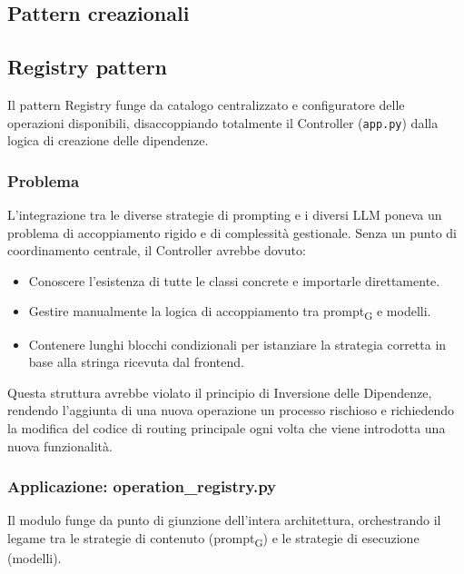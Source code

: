 \documentclass[11pt,a4paper]{article}
\newcommand{\gls}[1]{#1\textsubscript{G}}
\begin{document}
\newpage

\subsection{Pattern creazionali}
\subsection{Registry pattern}
Il pattern Registry funge da catalogo centralizzato e configuratore delle operazioni disponibili, disaccoppiando totalmente il Controller (\texttt{app.py}) dalla logica di creazione delle dipendenze.

\subsubsection{Problema}
L’integrazione tra le diverse strategie di prompting e i diversi LLM poneva un problema di accoppiamento rigido e di complessità gestionale. Senza un punto di coordinamento centrale, il Controller avrebbe dovuto:
\begin{itemize}
    \item Conoscere l'esistenza di tutte le classi concrete e importarle direttamente.
    \item Gestire manualmente la logica di accoppiamento tra \gls{prompt} e modelli.
    \item Contenere lunghi blocchi condizionali per istanziare la strategia corretta in base alla stringa ricevuta dal frontend.
\end{itemize}
Questa struttura avrebbe violato il principio di Inversione delle Dipendenze, rendendo l'aggiunta di una nuova operazione un processo rischioso e richiedendo la modifica del codice di routing principale ogni volta che viene introdotta una nuova funzionalità.

\subsubsection{Applicazione: operation\_registry.py}
Il modulo funge da punto di giunzione dell'intera architettura, orchestrando il legame tra le strategie di contenuto (\gls{prompt}) e le strategie di esecuzione (modelli).
\end{document}
